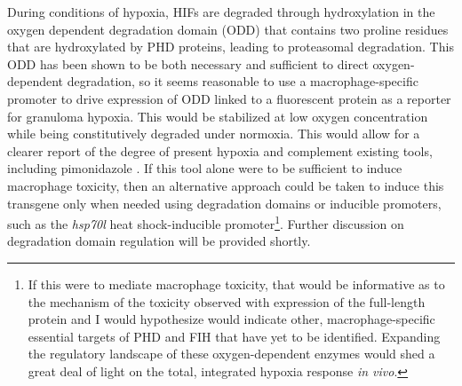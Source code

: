 During conditions of hypoxia, HIFs are degraded through hydroxylation in the oxygen dependent degradation domain (ODD) that contains two proline residues that are hydroxylated by PHD proteins, leading to proteasomal degradation. This ODD has been shown to be both necessary and sufficient to direct oxygen\hyp{}dependent degradation, so it seems reasonable to use a macrophage\hyp{}specific promoter to drive expression of ODD linked to a fluorescent protein as a reporter for granuloma hypoxia. This would be stabilized at low oxygen concentration while being constitutively degraded under normoxia. This would allow for a clearer report of the degree of present hypoxia and complement existing tools, including pimonidazole \citep{Huang1998, Cousins2016}. If this tool alone were to be sufficient to induce macrophage toxicity, then an alternative approach could be taken to induce this transgene only when needed using degradation domains or inducible promoters, such as the \textit{hsp70l} heat shock\hyp{}inducible promoter\footnote{If this were to mediate macrophage toxicity, that would be informative as to the mechanism of the toxicity observed with expression of the full\hyp{}length protein and I would hypothesize would indicate other, macrophage\hyp{}specific essential targets of PHD and FIH that have yet to be identified. Expanding the regulatory landscape of these oxygen\hyp{}dependent enzymes would shed a great deal of light on the total, integrated hypoxia response \textit{in vivo}.}. Further discussion on degradation domain regulation will be provided shortly.

